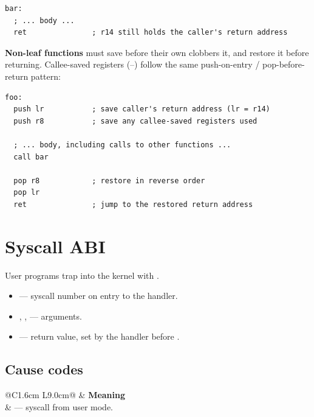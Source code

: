 \documentclass[11pt]{article}
\begin{document}
\begin{lstlisting}
bar:
  ; ... body ...
  ret               ; r14 still holds the caller's return address
\end{lstlisting}

\textbf{Non-leaf functions} must save  before their own 
clobbers it, and restore it before returning. Callee-saved registers
(--) follow the same push-on-entry / pop-before-return pattern:

\begin{lstlisting}
foo:
  push lr           ; save caller's return address (lr = r14)
  push r8           ; save any callee-saved registers used

  ; ... body, including calls to other functions ...
  call bar

  pop r8            ; restore in reverse order
  pop lr
  ret               ; jump to the restored return address
\end{lstlisting}

\section{Syscall ABI}

User programs trap into the kernel with .

\begin{itemize}[leftmargin=1.4em]
  \item {} --- syscall number on entry to the handler.
  \item {}, ,  --- arguments.
  \item {} --- return value, set by the handler before .
\end{itemize}

\subsection{Cause codes}
\begin{center}
\begin{tabular}{@{}C{1.6cm} L{9.0cm}@{}}
\toprule
\textbf{} & \textbf{Meaning} \\
 &  --- syscall from user mode. \\
\bottomrule
\end{tabular}
\end{center}
\end{document}
